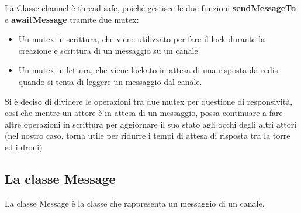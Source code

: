 \documentclass[a4paper, 11pt]{article}
\begin{document}
La Classe channel è thread safe, poiché gestisce le due funzioni \textbf{sendMessageTo} e \textbf{awaitMessage} tramite due mutex:
\begin{itemize}
    \item Un mutex in scrittura, che viene utilizzato per fare il lock durante la creazione e scrittura di un messaggio su un canale
    \item Un mutex in lettura, che viene lockato in attesa di una risposta da redis quando si tenta di leggere un messaggio dal canale.
\end{itemize}

Si è deciso di dividere le operazioni tra due mutex per questione di responsività, così che mentre un attore è in attesa di un messaggio,
possa continuare a fare altre operazioni in scrittura per aggiornare il suo stato agli occhi degli altri attori (nel nostro caso, 
torna utile per ridurre i tempi di attesa di risposta tra la torre ed i droni)
\newpage
\subsection{La classe Message}
La classe Message è la classe che rappresenta un messaggio di un canale.
\end{document}
